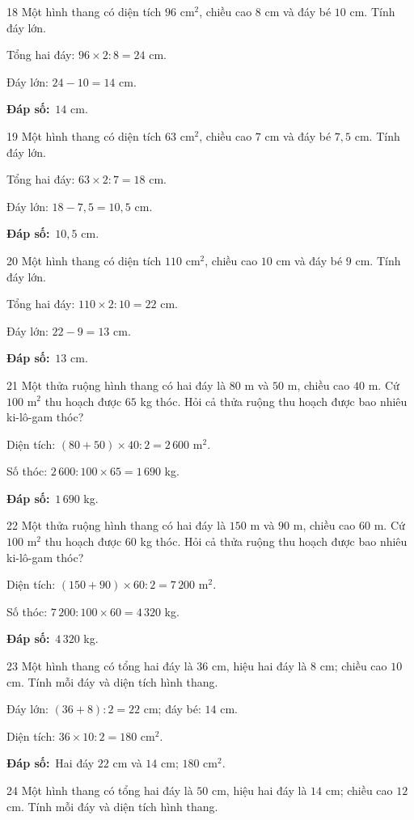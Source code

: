 \documentclass[11pt]{article}
\newif\ifsol \solfalse
\providecommand{\AnsWord}{Đáp số}
\newcommand{\dapso}[1]{\par\textbf{\AnsWord:}\ #1}
\newcommand{\probsol}[1]{%
  \begin{lrbox}{\solmeasure}\begin{minipage}{\dimexpr\linewidth-24pt\relax}#1\end{minipage}\end{lrbox}%
  \ifsol
    \begin{solbox}#1\end{solbox}%
  \else
    \setlength{\solht}{\dimexpr\ht\solmeasure+\dp\solmeasure+0.85cm\relax}%
    \ifdim\solht<1.35cm\setlength{\solht}{1.35cm}\fi
    \begin{tcolorbox}[colback=white,colframe=Line,boxrule=0.8pt,arc=5pt,
      left=8pt,right=8pt,top=4pt,bottom=4pt,height=\solht]{\footnotesize\color{Slate}\itshape\WorkWord}\end{tcolorbox}%
  \fi}
\newcommand{\gap}{\vspace{0.3cm}}
\def\WorkWord{Bài làm:}
\def\AnsWord{Đáp số}
\begin{document}
\gap
\begin{probbox}{18}{\relax}
Một hình thang có diện tích $96$ cm$^2$, chiều cao $8$ cm và đáy bé $10$ cm. Tính đáy lớn.
\end{probbox}
\probsol{
Tổng hai đáy: $96\times2:8=24$ cm.\par Đáy lớn: $24-10=14$ cm.
\dapso{$14$ cm.}}
\gap
\begin{probbox}{19}{\relax}
Một hình thang có diện tích $63$ cm$^2$, chiều cao $7$ cm và đáy bé $7{,}5$ cm. Tính đáy lớn.
\end{probbox}
\probsol{
Tổng hai đáy: $63\times2:7=18$ cm.\par Đáy lớn: $18-7{,}5=10{,}5$ cm.
\dapso{$10{,}5$ cm.}}
\gap
\begin{probbox}{20}{\relax}
Một hình thang có diện tích $110$ cm$^2$, chiều cao $10$ cm và đáy bé $9$ cm. Tính đáy lớn.
\end{probbox}
\probsol{
Tổng hai đáy: $110\times2:10=22$ cm.\par Đáy lớn: $22-9=13$ cm.
\dapso{$13$ cm.}}
\gap
\begin{probbox}{21}{\relax}
Một thửa ruộng hình thang có hai đáy là $80$ m và $50$ m, chiều cao $40$ m. Cứ $100$ m$^2$ thu hoạch được $65$ kg thóc. Hỏi cả thửa ruộng thu hoạch được bao nhiêu ki-lô-gam thóc?
\end{probbox}
\probsol{
Diện tích: $(80+50)\times40:2=2\,600$ m$^2$.\par Số thóc: $2\,600:100\times65=1\,690$ kg.
\dapso{$1\,690$ kg.}}
\gap
\begin{probbox}{22}{\relax}
Một thửa ruộng hình thang có hai đáy là $150$ m và $90$ m, chiều cao $60$ m. Cứ $100$ m$^2$ thu hoạch được $60$ kg thóc. Hỏi cả thửa ruộng thu hoạch được bao nhiêu ki-lô-gam thóc?
\end{probbox}
\probsol{
Diện tích: $(150+90)\times60:2=7\,200$ m$^2$.\par Số thóc: $7\,200:100\times60=4\,320$ kg.
\dapso{$4\,320$ kg.}}
\gap
\begin{probbox}{23}{\relax}
Một hình thang có tổng hai đáy là $36$ cm, hiệu hai đáy là $8$ cm; chiều cao $10$ cm. Tính mỗi đáy và diện tích hình thang.
\end{probbox}
\probsol{
Đáy lớn: $(36+8):2=22$ cm; đáy bé: $14$ cm.\par Diện tích: $36\times10:2=180$ cm$^2$.
\dapso{Hai đáy $22$ cm và $14$ cm; $180$ cm$^2$.}}
\gap
\begin{probbox}{24}{\relax}
Một hình thang có tổng hai đáy là $50$ cm, hiệu hai đáy là $14$ cm; chiều cao $12$ cm. Tính mỗi đáy và diện tích hình thang.
\end{probbox}
\end{document}
